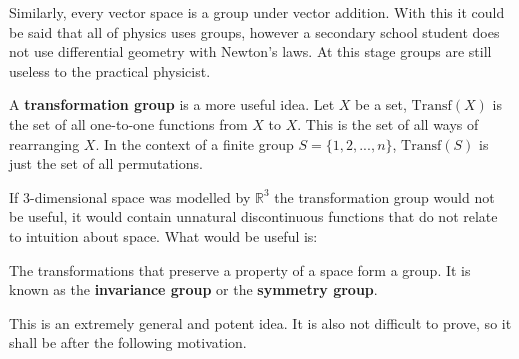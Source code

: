 Similarly, every vector space is a group under vector addition. With this it could be said that all of physics uses groups, however a secondary school student does not use differential geometry with Newton's laws. At this stage groups are still useless to the practical physicist.

A \textbf{transformation group} is a more useful idea. Let $X$ be a set, $\mathrm{Transf}(X)$ is the set of all one-to-one functions from $X$ to $X$. This is the set of all ways of rearranging $X$. In the context of a finite group $S=\{1,2,...,n\}$, $\mathrm{Transf}(S)$ is just the set of all permutations. 

If $3$-dimensional space was modelled by $\mathbb{R}^3$ the transformation group would not be useful, it would contain unnatural discontinuous functions that do not relate to intuition about space. What would be useful is:
\begin{center}
The transformations that preserve a property of a space form a group. It is known as the \textbf{invariance group} or the \textbf{symmetry group}.
\end{center}
 This is an extremely general and potent idea. It is also not difficult to prove, so it shall be after the following motivation.
 
